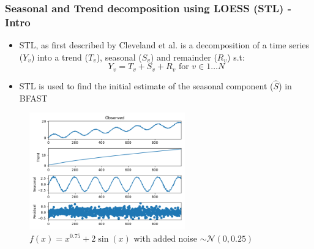 \documentclass[presentation.tex]{subfiles}
\begin{document}
\begin{frame}
\frametitle{Seasonal and Trend decomposition using LOESS (STL) - Intro}
\begin{itemize}
\item STL, as first described by Cleveland et al. is a decomposition of a time
  series ($Y_v$) into a trend ($T_v$), seasonal ($S_v$) and remainder
  ($R_v$) s.t:
  \[
  Y_v = T_v + S_v + R_v \text{ for } v \in 1 \hdots N
  \]
\item STL is used to find the initial estimate of the seasonal component ($\hat{S}$) in BFAST
\end{itemize}
  \begin{figure}[H]
    \centering
    \includegraphics[width=0.6\textwidth]{imgs/stl1.png}
    \caption{$f(x) = x^{0.75} + 2\sin(x)$ with added noise
      $\sim \mathcal{N}(0, 0.25)$}
  \end{figure}
  \centering
\end{frame}


\end{document}
